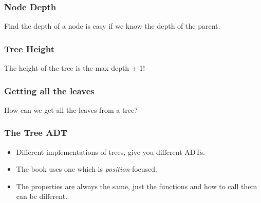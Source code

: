 \begin{frame}
	\frametitle{Node Depth}

			Find the depth of a node is easy if we know the depth of the parent.
		
		
\end{frame}


\begin{frame}
	\frametitle{Tree Height}

			The height of the tree is the max depth + 1! 	
		
		
\end{frame}

\begin{frame}
	\frametitle{Getting all the leaves}
How can we get all the leaves from a tree?
		
		
\end{frame}


\begin{frame}
	\frametitle{The Tree ADT}
		\begin{itemize}
				\item Different implementations of trees, give you different ADTs.
				\item The book uses one which is \textit{position}-focused.
				\item The properties are always the same, just the functions and how to call them can be different.
		\end{itemize}	
\end{frame}

